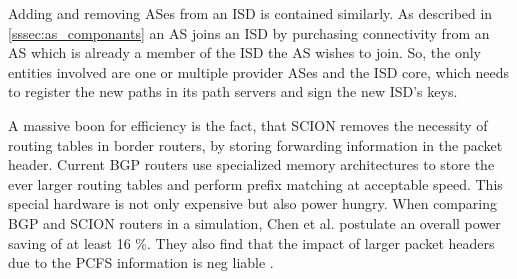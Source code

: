 \documentclass[../eva1_scion.tex]{subfiles}
\begin{document}
    Adding and removing ASes from an ISD is contained similarly. As described in \ref{sssec:as_componants} an AS joins an ISD by purchasing connectivity from an AS which is already a member of the ISD the AS wishes to join. So, the only entities involved are one or multiple provider ASes and the ISD core, which needs to register the new paths in its path servers and sign the new ISD's keys.

    A massive boon for efficiency is the fact, that SCION removes the necessity of routing tables in border routers, by storing forwarding information in the packet header. Current BGP routers use specialized memory architectures to store the ever larger routing tables and perform prefix matching at acceptable speed. This special hardware is not only expensive but also power hungry. When comparing BGP and SCION routers in a simulation, Chen et al. postulate an overall power saving of at least 16 \%. They also find that the impact of larger packet headers due to the PCFS information is neg liable \cite{scion_power}.
\end{document}
